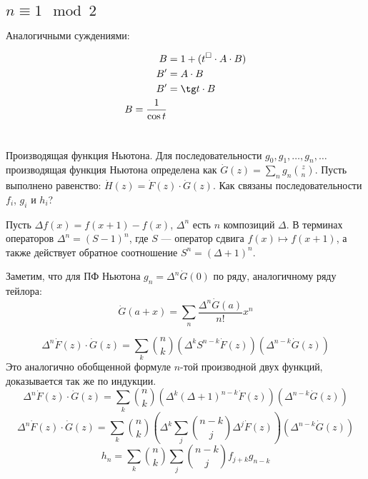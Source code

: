 \subsection{\(n \equiv 1 \mod 2\)}

Аналогичными суждениями:

\begin{align}
    B  & = 1 + (t^\square \cdot A \cdot B) \\
    B' & = A \cdot B                       \\
    B' & = \tg t \cdot B                   \\
    B = \frac{1}{\cos t}
\end{align}

\section{}
Производящая функция Ньютона. Для последовательности $g_0, g_1, \ldots, g_n, \ldots$ производящая функция Ньютона определена как $\dot G(z) = \sum_n g_n{z \choose n}$. Пусть выполнено равенство: $\dot H(z) = \dot F(z) \cdot \dot G(z)$. Как связаны последовательности $f_i$, $g_i$ и $h_i$?


Пусть \(\Delta f(x) = f(x + 1) - f(x)\), \(\Delta^n\) есть \(n\) композиций \(\Delta\). В терминах операторов \(\Delta^n = (S - 1)^n\), где \(S\) --- оператор сдвига \(f(x) \mapsto f(x + 1)\), а также действует обратное соотношение \(S^n = (\Delta + 1)^n\).

Заметим, что для ПФ Ньютона \(g_n = \Delta^n \dot{G}(0)\) по ряду, аналогичному ряду тейлора:
\[\dot{G}(a + x) = \sum_n \frac{\Delta^n \dot{G}(a)}{n!} x^n \]

\[\Delta^n \dot{F}(z) \cdot \dot{G}(z) = \sum_k \binom{n}{k} (\Delta^k S^{n - k} \dot{F}(z))(\Delta^{n - k} \dot{G}(z))\]
Это аналогично обобщенной формуле \(n\)-той производной двух функций, доказывается так же по индукции.
\[\Delta^n \dot{F}(z) \cdot \dot{G}(z) = \sum_k \binom{n}{k} (\Delta^k (\Delta + 1)^{n - k} \dot{F}(z))(\Delta^{n - k} \dot{G}(z))\]
\[\Delta^n \dot{F}(z) \cdot \dot{G}(z) = \sum_k \binom{n}{k} (\Delta^k \sum_j \binom{n - k}{j} \Delta^j \dot{F}(z))(\Delta^{n - k} \dot{G}(z))\]
\[h_n = \sum_k \binom{n}{k} \sum_j \binom{n - k}{j} f_{j + k} g_{n - k}\]

